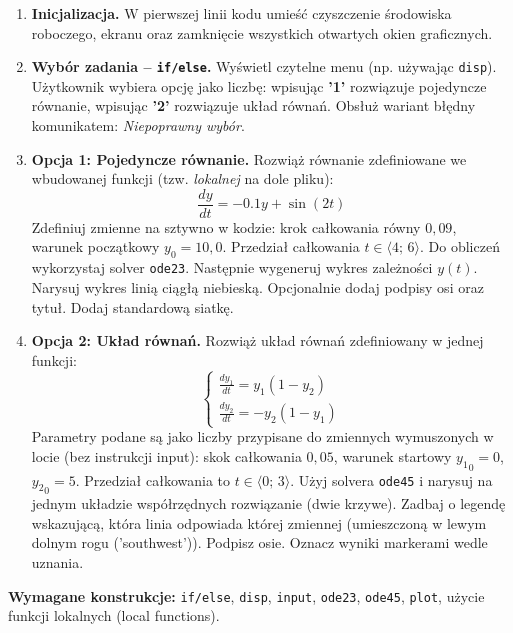 \documentclass[a4paper,11pt]{article}
\begin{document}
\begin{enumerate}[leftmargin=*, label=\textbf{\arabic*.}, itemsep=2pt]

  \item \textbf{Inicjalizacja.}
    W pierwszej linii kodu umieść czyszczenie środowiska roboczego, ekranu oraz zamknięcie wszystkich otwartych okien graficznych.

  \item \textbf{Wybór zadania -- \texttt{if/else}.}
    Wyświetl czytelne menu (np. używając \texttt{disp}). Użytkownik wybiera opcję jako liczbę: wpisując \textbf{'1'} rozwiązuje pojedyncze równanie, wpisując \textbf{'2'} rozwiązuje układ równań. Obsłuż wariant błędny komunikatem: \textit{Niepoprawny wybór}.

  \item \textbf{Opcja 1: Pojedyncze równanie.}
    Rozwiąż równanie zdefiniowane we wbudowanej funkcji (tzw. \textit{lokalnej} na dole pliku):
    \[ \frac{dy}{dt} = -0.1y + \sin(2t) \]
    Zdefiniuj zmienne na sztywno w kodzie: krok całkowania równy $0{,}09$, warunek początkowy $y_0 = 10{,}0$. Przedział całkowania $t \in \langle 4;\,6 \rangle$.
    Do obliczeń wykorzystaj solver \texttt{ode23}. Następnie wygeneruj wykres zależności $y(t)$. Narysuj wykres linią ciągłą niebieską. Opcjonalnie dodaj podpisy osi oraz tytuł. Dodaj standardową siatkę.

  \item \textbf{Opcja 2: Układ równań.}
    Rozwiąż układ równań zdefiniowany w jednej funkcji:\\[-0.5em]
    \[
    \begin{cases}
      \frac{dy_1}{dt} = y_1(1 - y_2) \\
      \frac{dy_2}{dt} = -y_2(1 - y_1)
    \end{cases}
    \]
    Parametry podane są jako liczby przypisane do zmiennych wymuszonych w locie (bez instrukcji input): skok całkowania $0{,}05$, warunek startowy $ {y_1}_{0} = 0 $, $ {y_2}_{0} = 5 $. Przedział całkowania to $t \in \langle 0;\,3 \rangle$.
    Użyj solvera \texttt{ode45} i narysuj na jednym układzie współrzędnych rozwiązanie (dwie krzywe). Zadbaj o legendę wskazującą, która linia odpowiada której zmiennej (umieszczoną w lewym dolnym rogu ('southwest')). Podpisz osie. Oznacz wyniki markerami wedle uznania.

\end{enumerate}

\vspace{0.3cm}
\begin{ramka}
\textbf{Wymagane konstrukcje:}
\texttt{if/else}, \texttt{disp}, \texttt{input}, \texttt{ode23}, \texttt{ode45}, \texttt{plot}, użycie funkcji lokalnych (local functions).
\end{ramka}
\end{document}
